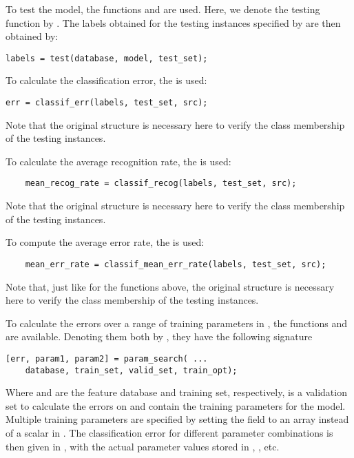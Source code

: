 \documentclass{article}
\begin{document}
To test the model, the functions  and  are used. Here, we denote the testing function by . The labels obtained for the testing instances specified by  are then obtained by:
\begin{lstlisting}
labels = test(database, model, test_set);
\end{lstlisting}
To calculate the classification error, the  is used:
\begin{lstlisting}
err = classif_err(labels, test_set, src);
\end{lstlisting}
Note that the original  structure is necessary here to verify the class membership of the testing instances.

To calculate the average recognition rate, the  is used:
\begin{lstlisting}
    mean_recog_rate = classif_recog(labels, test_set, src);
\end{lstlisting}
Note that the original  structure is necessary here to verify the class membership of the testing instances.


To compute the average error rate, the  is used:
\begin{lstlisting}
    mean_err_rate = classif_mean_err_rate(labels, test_set, src);
\end{lstlisting}
Note that, just like for the functions above, the original  structure is necessary here to verify the class membership of the testing instances.


To calculate the errors over a range of training parameters in , the functions  and  are available. Denoting them both by , they have the following signature
\begin{lstlisting}
[err, param1, param2] = param_search( ...
	database, train_set, valid_set, train_opt);
\end{lstlisting}

Where  and  are the feature database and training set, respectively,  is a validation set to calculate the errors on and  contain the training parameters for the model. Multiple training parameters are specified by setting the field to an array instead of a scalar in . The classification error for different parameter combinations is then given in , with the actual parameter values stored in , , etc.
\end{document}
